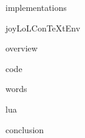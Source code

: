 
\usemodule[t-diSimp]

\startDiSimpComponent implementations

\diSimpEnvironment joyLoLConTeXtEnv

\startJoyLoLCoAlg[title=JoyLoL implementations][implementations]

\diSimpComponent overview

\diSimpComponent code

\diSimpComponent words

\diSimpComponent lua

\diSimpComponent conclusion

\stopJoyLoLCoAlg

\stopDiSimpComponent
